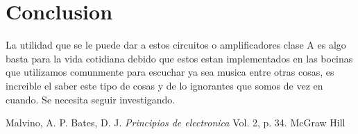 \documentclass[12pt,a4paper]{article}
\begin{document}
\section{Conclusion}
La utilidad que se le puede dar a estos circuitos o amplificadores clase A es algo basta para la vida cotidiana debido que estos estan implementados en las bocinas que utilizamos comunmente para escuchar ya sea musica entre otras cosas, es increible el saber este tipo de cosas y de lo ignorantes que somos de vez en cuando. Se necesita seguir investigando.

\begin{thebibliography}{10}
 Malvino, A. P. Bates, D. J. \emph{Principios de electronica} Vol. 2, p. 34. McGraw Hill

\end{thebibliography}
\end{document}
